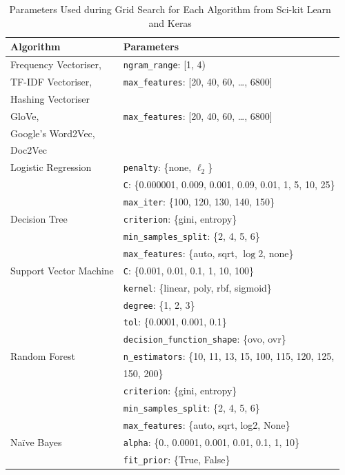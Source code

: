 \begin{table}[t]
\centering
\footnotesize
\caption{Parameters Used during Grid Search for Each Algorithm from Sci-kit Learn~\cite{scikit-learn} and Keras~\cite{chollet2015}}\label{parameters}
\begin{tabular}{ll}
\toprule
Algorithm & Parameters\\
\midrule
Frequency Vectoriser, & \texttt{ngram\_range}: [1, 4)\\
TF-IDF Vectoriser, & \texttt{max\_features}: [20, 40, 60, \ldots, 6800]\\
Hashing Vectoriser & \\
\midrule
GloVe, & \texttt{max\_features}: [20, 40, 60, \ldots, 6800]\\
Google's Word2Vec, & \\
Doc2Vec & \\
\midrule
Logistic Regression & \texttt{penalty}: \{none, $\ell_2$\}\\
& \texttt{C}: \{0.000001, 0.009, 0.001, 0.09, 0.01, 1, 5, 10, 25\}\\
& \texttt{max\_iter}: \{100, 120, 130, 140, 150\}\\
\midrule
Decision Tree & \texttt{criterion}: \{gini, entropy\}\\
& \texttt{min\_samples\_split}: \{2, 4, 5, 6\}\\
& \texttt{max\_features}: \{auto, sqrt, $\log$2, none\}\\
\midrule
Support Vector Machine & \texttt{C}: \{0.001, 0.01, 0.1, 1, 10, 100\}\\
& \texttt{kernel}: \{linear, poly, rbf, sigmoid\}\\
& \texttt{degree}: \{1, 2, 3\}\\
& \texttt{tol}: \{0.0001, 0.001, 0.1\}\\
& \texttt{decision\_function\_shape}: \{ovo, ovr\}\\ 
\midrule
Random Forest & \texttt{n\_estimators}: \{10, 11, 13, 15, 100, 115, 120, 125,\\
& 150, 200\}\\
& \texttt{criterion}: \{gini, entropy\}\\
& \texttt{min\_samples\_split}: \{2, 4, 5, 6\}\\
& \texttt{max\_features}: \{auto, sqrt, log2, None\}\\
\midrule
Na\"ive Bayes & \texttt{alpha}: \{0., 0.0001, 0.001, 0.01, 0.1, 1, 10\}\\
& \texttt{fit\_prior}: \{True, False\}\\
\midrule

\end{tabular}
\end{table}
